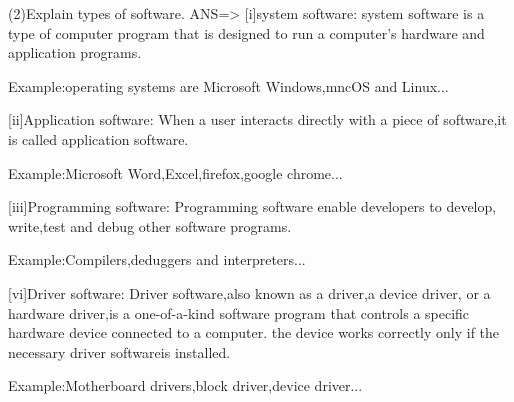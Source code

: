 (2)Explain types of software.
ANS=>
[i]system software: system software is a type of computer program that
                        is designed to run a computer's hardware and 
						application programs.
						
						Example:operating systems are Microsoft Windows,mncOS
                        and Linux...					
 
[ii]Application software: When a user interacts directly with a piece of 
                         software,it is called application software.
                           						 
                         Example:Microsoft Word,Excel,firefox,google chrome...
	
[iii]Programming software: Programming software enable developers to develop,
                          write,test and debug other software programs.
                            
							
						 Example:Compilers,deduggers and interpreters...
						 
[vi]Driver software: Driver software,also known as a driver,a device driver,
                    or a hardware driver,is a one-of-a-kind software program
                    that controls a specific hardware device connected to a 
					computer. the device works correctly only if the necessary
					driver softwareis installed.
					
					Example:Motherboard drivers,block driver,device driver...
					
